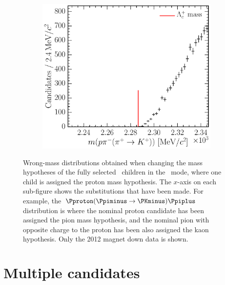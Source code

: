 \begin{figure}
\begin{subfigure}[b]{0.3\textwidth}
    \caption{\decay{\PLambdac}{\Pproton\PKminus\PKplus}}
    \label{fig:cpv:selection:background_study:ppipi_baryon:pkk}
  \end{subfigure}
  \begin{subfigure}[b]{0.3\textwidth}
    \includegraphics[width=\textwidth]{figures/cpv/selection/background_study/ppipi/LcToppipi_2012_MagDown_Lc_pp_pim_pipTokp}
    \caption{\decay{\PLambdac}{\Pproton\Ppiminus\PKplus}}
    \label{fig:cpv:selection:background_study:ppipi_baryon:ppik}
  \end{subfigure}
  \caption{%
    Wrong-mass distributions obtained when changing the mass hypotheses of the 
    fully selected \PLambdac\ children in the \ppipi\ mode, where one child is 
    assigned the proton mass hypothesis.
    The $x$-axis on each sub-figure shows the substitutions that have been 
    made.
    For example, the ${\Pproton(\Ppiminus \to \PKminus)\Ppiplus}$ distribution is where the 
    nominal proton candidate has been assigned the pion mass hypothesis, and 
    the nominal pion with opposite charge to the proton has been also assigned 
    the kaon hypothesis.
    Only the 2012 magnet down data is shown.
  }
  \label{fig:cpv:selection:background_study:ppipi_baryon}
\end{figure}

\section{Multiple candidates}
\label{chap:cpv:selection:multiple_candidates}

